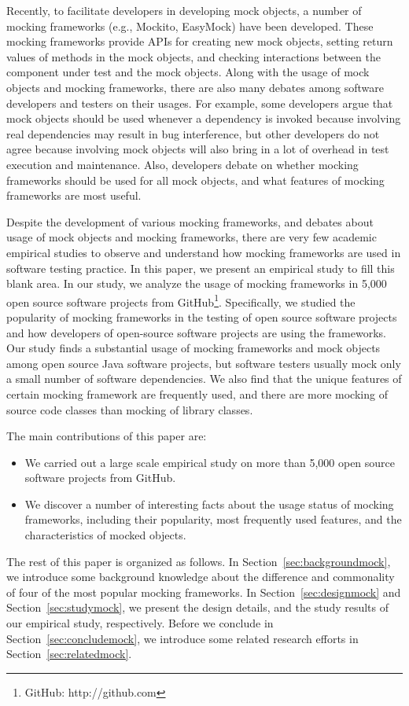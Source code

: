 Recently, to facilitate developers in developing mock objects, a number of mocking frameworks (e.g., Mockito, EasyMock) have been developed. These mocking frameworks provide APIs for creating new mock objects, setting return values of methods in the mock objects, and checking interactions between the component under test and the mock objects. Along with the usage of mock objects and mocking frameworks, there are also  many debates among software developers and testers on their usages. For example, some developers argue that mock objects should be used whenever a dependency is invoked because involving real dependencies may result in bug interference, but other developers do not agree because involving mock objects will also bring in a lot of overhead in test execution and maintenance. Also, developers debate on whether mocking frameworks should be used for all mock objects, and what features of mocking frameworks are most useful. 

Despite the development of various mocking frameworks, and debates about usage of mock objects and mocking frameworks, there are very few academic empirical studies to observe and understand how mocking frameworks are used in software testing practice. In this paper, we present an empirical study to fill this blank area. In our study, we analyze the usage of mocking frameworks in 5,000 open source software projects from GitHub\footnote{GitHub: http://github.com}. Specifically, we studied the popularity of mocking frameworks in the testing of open source software projects and how developers of open-source software projects are using the frameworks. Our study finds a substantial usage of mocking frameworks and mock objects among open source Java software projects, but software testers usually mock only a small number of software dependencies. We also find that the unique features of certain mocking framework are frequently used, and there are more mocking of source code classes than mocking of library classes. 
 
The main contributions of this paper are: 
\begin{itemize}
\item We carried out a large scale empirical study on more than 5,000 open source software projects from GitHub. 
\item We discover a number of interesting facts about the usage status of mocking frameworks, including their popularity, most frequently used features, and the characteristics of mocked objects.
\end{itemize}
 
The rest of this paper is organized as follows. In Section~\ref{sec:backgroundmock}, we introduce some background knowledge about the difference and commonality of four of the most popular mocking frameworks. In Section~\ref{sec:designmock} and Section~\ref{sec:studymock}, we present the design details, and the study results of our empirical study, respectively. Before we conclude in Section~\ref{sec:concludemock}, we introduce some related research efforts in Section~\ref{sec:relatedmock}.

